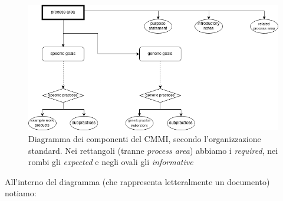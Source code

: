 \documentclass[a4paper,12pt, oneside]{book}
\begin{document}
\begin{figure}[H]
  \centering
  \includegraphics[scale = 0.54]{img/cmmi.png}
  \caption{Diagramma dei componenti del CMMI, secondo l'organizzazione
    standard. Nei rettangoli (tranne \textit{process area}) abbiamo i
    \textit{required}, nei rombi gli \textit{expected} e negli ovali gli
    \textit{informative}} 
  \label{fig:cmmi}
\end{figure}
All'interno del diagramma (che rappresenta letteralmente un documento) notiamo:
\end{document}
